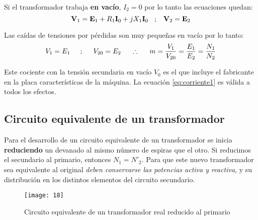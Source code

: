 Si el transformador trabaja \textbf{en vacío}, $I_{2}=0$ por lo tanto las ecuaciones quedan:
\begin{equation*}
	\fasor{v}_{1} = \fasor{e}_{1} + R_{1} \fasor{i}_{0} + j X_{1} \fasor{i}_{0}  \hspace{.3cm};\hspace{.3cm}	\fasor{v}_{2} = \fasor{e}_{2}
\end{equation*}

Las caídas de tensiones por pérdidas son muy pequeñas en vacío por lo tanto:
\begin{equation}
	V_{1}=E_{1} \hspace{5mm} ; \hspace{5mm} V_{20}=E_{2} \hspace{5mm} \therefore \hspace{5mm} m=\dfrac{V_{1}}{V_{20}}=\dfrac{E_{1}}{E_{2}}=\dfrac{N_{1}}{N_{2}}
\end{equation}


Este cociente con la tensión secundaria en vacío $V_0$ es el que incluye el fabricante en la placa características de la máquina. La ecuación \ref{eq:corriente1} es válida a todos los efectos.

\subsection{Circuito equivalente de un transformador}
Para el desarrollo de un circuito equivalente de un transformador se inicia \textbf{reduciendo} un devanado al mismo número de espiras que el otro. Si reducimos el secundario al primario, entonces $N_{1}=N'_{2}$. Para que este nuevo transformador sea equivalente al original \textsl{deben conservarse las potencias activa y reactiva}, y su distribución en los distintos elementos del circuito secundario. 
\begin{figure}[H]
	\centering
	\texttt{[image: 18]}
	\caption{Circuito equivalente de un transformador real reducido al primario}
\end{figure} 

